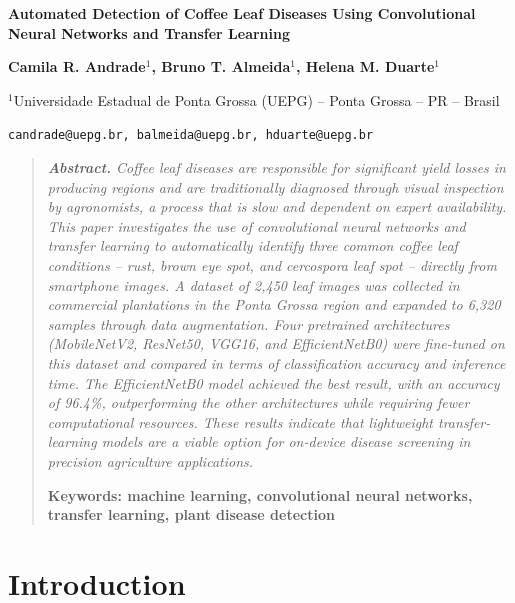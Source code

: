 \documentclass[11pt,a4paper]{article}
\begin{document}
\begin{center}
  {\large\bfseries Automated Detection of Coffee Leaf Diseases Using Convolutional Neural Networks and Transfer Learning}
  \vspace{0.8em}

  {\bfseries Camila R. Andrade$^1$, Bruno T. Almeida$^1$, Helena M. Duarte$^1$}
  \vspace{0.6em}

  $^1$Universidade Estadual de Ponta Grossa (UEPG) -- Ponta Grossa -- PR -- Brasil
  \vspace{0.3em}

  \texttt{candrade@uepg.br, balmeida@uepg.br, hduarte@uepg.br}
\end{center}

\vspace{1.2em}


\begin{quote}
\itshape
\noindent\textbf{Abstract.} Coffee leaf diseases are responsible for significant
yield losses in producing regions and are traditionally diagnosed through
visual inspection by agronomists, a process that is slow and dependent on
expert availability. This paper investigates the use of convolutional
neural networks and transfer learning to automatically identify three
common coffee leaf conditions -- rust, brown eye spot, and cercospora
leaf spot -- directly from smartphone images. A dataset of 2,450 leaf
images was collected in commercial plantations in the Ponta Grossa
region and expanded to 6,320 samples through data augmentation.
Four pretrained architectures (MobileNetV2, ResNet50, VGG16, and
EfficientNetB0) were fine-tuned on this dataset and compared in terms
of classification accuracy and inference time. The EfficientNetB0 model
achieved the best result, with an accuracy of 96.4\%, outperforming the
other architectures while requiring fewer computational resources.
These results indicate that lightweight transfer-learning models are a
viable option for on-device disease screening in precision agriculture
applications.

\vspace{0.6em}
\noindent\textbf{Keywords: machine learning, convolutional neural networks, transfer learning, plant disease detection}
\end{quote}

\vspace{1.0em}


\section{Introduction}
\end{document}
